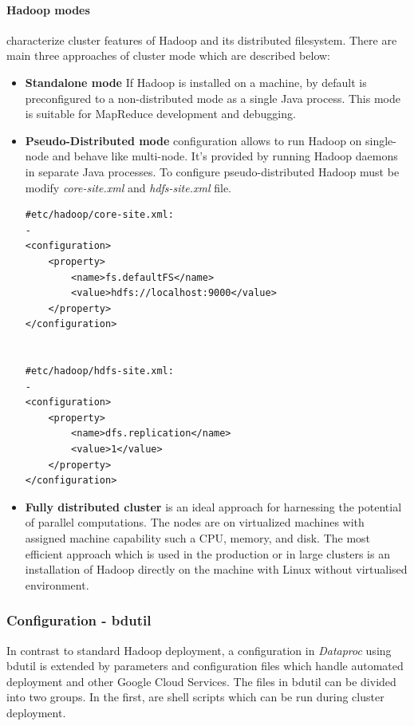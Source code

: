 \documentclass[a4paper,12pt,oneside]{report}
\begin{document}
\paragraph{Hadoop modes} characterize cluster features of Hadoop and its distributed filesystem. 
There are main three approaches of cluster mode which are described below:
\begin{itemize}
\item \textbf{Standalone mode} If Hadoop is installed on a machine, by default is preconfigured to a 
non-distributed mode as a single Java process. This mode  is suitable for MapReduce development and debugging.
\item \textbf{Pseudo-Distributed mode}  configuration allows to run  Hadoop on single-node and behave
 like multi-node. It's provided by running Hadoop daemons in separate Java processes. To configure pseudo-distributed Hadoop must be modify \textit{core-site.xml} and \textit{hdfs-site.xml} file\cite{hadoop_modes}.  


\begin{footnotesize}
\begin{lstlisting}[style=python]
#etc/hadoop/core-site.xml:
-
<configuration>
    <property>
        <name>fs.defaultFS</name>
        <value>hdfs://localhost:9000</value>
    </property>
</configuration>


#etc/hadoop/hdfs-site.xml: 
-
<configuration>
    <property>
        <name>dfs.replication</name>
        <value>1</value>
    </property>
</configuration>
\end{lstlisting}
\end{footnotesize}

\item \textbf{Fully distributed cluster} is an ideal approach for harnessing the potential of
 parallel computations. The nodes are on virtualized machines with assigned machine capability 
 such a CPU, memory, and disk. The most efficient approach which is used in the production or 
 in large clusters is an installation of Hadoop directly on the machine with Linux without virtualised environment.

\end{itemize}


\subsubsection{Configuration - bdutil}
In contrast to standard Hadoop deployment, a configuration in \textit{Dataproc} using bdutil is 
extended by parameters and configuration files which handle automated deployment and other Google
Cloud Services. The files in bdutil can be divided into two groups. In the first,  are shell scripts 
which can be run during cluster deployment.
\end{document}
